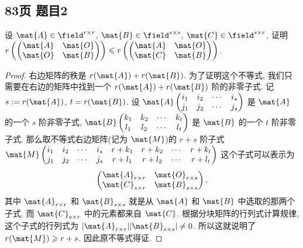 \subsection*{83页 题目2}
\begin{problem*}
设 $\mat{A} \in \field^{r \times r}$, $\mat{B} \in \field^{s \times s}$, $\mat{C} \in \field^{s \times r}$, 证明 $r\left(\begin{pmatrix} \mat{A} & \mat{O} \\ \mat{O} & \mat{B} \end{pmatrix}\right) \leqslant r\left(\begin{pmatrix} \mat{A} & \mat{O} \\ \mat{C} & \mat{B} \end{pmatrix}\right)$.
\end{problem*}
\begin{proof}
右边矩阵的秩是 $r(\mat{A}) + r(\mat{B})$. 为了证明这个不等式, 我们只需要在右边的矩阵中找到一个 $r(\mat{A}) + r(\mat{B})$ 阶的非零子式. 记 $s := r(\mat{A})$, $t = r(\mat{B})$. 设 
$\mat{A}\begin{pmatrix}
    i_1 & i_2 & \cdots & i_s \\
    j_1 & j_2 & \cdots & j_s
\end{pmatrix}$ 是 $\mat{A}$ 的一个 $s$ 阶非零子式, 
$\mat{B}\begin{pmatrix}
    k_1 & k_2 & \cdots & k_t \\
    l_1 & l_2 & \cdots & l_t
\end{pmatrix}$ 是 $\mat{B}$ 的一个 $t$ 阶非零子式. 那么取不等式右边矩阵(记为 $\mat{M}$)的 $r + s$ 阶子式
$\mat{M}\begin{pmatrix}
    i_1 & i_2 & \cdots & i_s & r + k_1 & r + k_2 & \cdots & r + k_t \\
    j_1 & j_2 & \cdots & j_s & r + l_1 & r + l_2 & \cdots & r + l_t
\end{pmatrix}$
这个子式可以表示为
\[
    \begin{pmatrix}
        \mat{A}_{r \times r} & \mat{O}_{r \times s} \\
        \mat{C}_{s \times r} & \mat{B}_{s \times s}
    \end{pmatrix},
\]
其中 $\mat{A}_{r \times r}$ 和 $\mat{B}_{s \times s}$ 就是从 $\mat{A}$ 和 $\mat{B}$ 中选取的那两个子式. 而 $\mat{C}_{s \times r}$ 中的元素都来自 $\mat{C}$. 根据分块矩阵的行列式计算规律, 这个子式的行列式为 $|\mat{A}_{r \times r}||\mat{B}_{s \times s}| \not= 0$. 所以这就说明了 $r(\mat{M}) \geqslant r + s$. 因此原不等式得证.
\end{proof}

